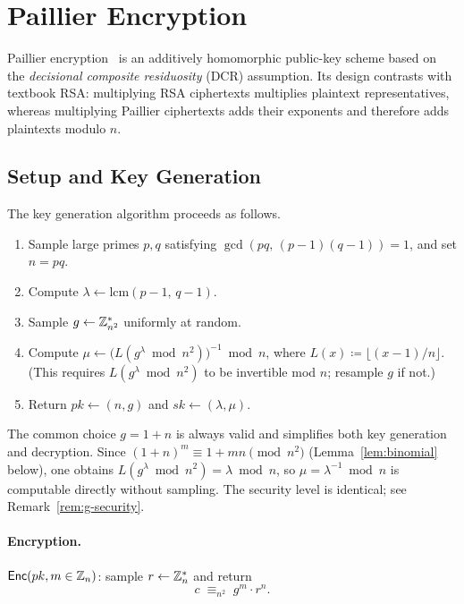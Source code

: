\section{Paillier Encryption}

Paillier encryption~\cite{Paillier1999} is an additively homomorphic public-key scheme based on the
\emph{decisional composite residuosity} (DCR) assumption. Its design contrasts with textbook RSA: multiplying RSA ciphertexts multiplies plaintext representatives, whereas multiplying Paillier ciphertexts adds their exponents and therefore adds plaintexts modulo $n$.

\subsection{Setup and Key Generation}

The key generation algorithm proceeds as follows.

\begin{enumerate}
  \item Sample large primes $p, q$ satisfying $\gcd(pq,\, (p-1)(q-1)) = 1$, and set $n = pq$.
  \item Compute $\lambda \gets \mathrm{lcm}(p-1,\, q-1)$.
  \item Sample $g \gets \mathbb{Z}_{n^2}^*$ uniformly at random.
  \item Compute $\mu \gets \bigl(L(g^\lambda \bmod n^2)\bigr)^{-1} \bmod n$, where
        $L(x) \coloneqq \lfloor (x-1)/n \rfloor$.
        (This requires $L(g^\lambda \bmod n^2)$ to be invertible mod $n$; resample $g$ if not.)
  \item Return $pk \gets (n, g)$ and $sk \gets (\lambda, \mu)$.
\end{enumerate}

\begin{remark}
  The common choice $g = 1 + n$ is always valid and simplifies both key generation and
  decryption. Since $(1+n)^m \equiv 1 + mn \pmod{n^2}$ (Lemma~\ref{lem:binomial} below),
  one obtains $L(g^\lambda \bmod n^2) = \lambda \bmod n$, so $\mu = \lambda^{-1} \bmod n$
  is computable directly without sampling. The security level is identical; see
  Remark~\ref{rem:g-security}.
\end{remark}

\paragraph{Encryption.}
$\mathsf{Enc}(pk, m \in \mathbb{Z}_n)$: sample $r \gets \mathbb{Z}_n^*$ and return
\[
  c \;\equiv_{n^2}\; g^m \cdot r^n.
\]

